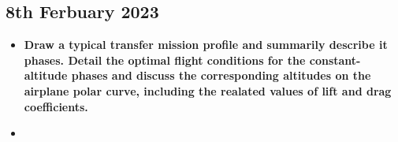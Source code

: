 \subsection{8th Ferbuary 2023}
\begin{itemize}
    \item \textbf{Draw a typical transfer mission profile and summarily describe it phases. Detail the optimal flight conditions for the constant-altitude phases and discuss the corresponding altitudes on the airplane polar curve, including the realated values of lift and drag coefficients.}
    \item \textbf{}
\end{itemize}